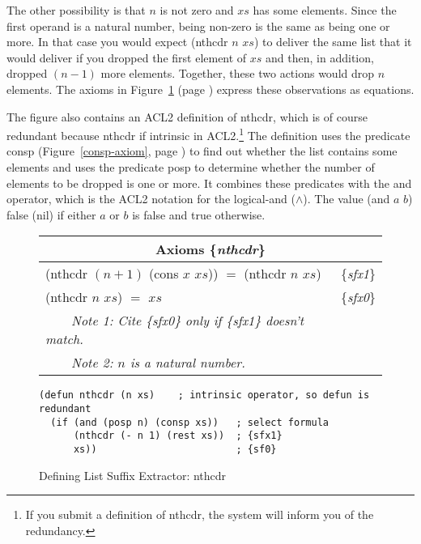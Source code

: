 The other possibility is that $n$ is not zero and $xs$ has some elements.
Since the first operand is a natural number,
being non-zero is the same as being one or more.
In that case you would expect \textsf{(nthcdr $n$ $xs$)} to deliver
the same list that it would deliver
if you dropped the first element of $xs$
and then, in addition, dropped $(n - 1)$ more elements.
Together, these two actions would drop $n$ elements.
The axioms in Figure~\ref{fig:nthcdr-defun} (page \pageref{fig:nthcdr-defun})
express these observations as equations.

The figure also contains an ACL2 definition of \textsf{nthcdr}, which
is of course redundant because \textsf{nthcdr} if intrinsic in ACL2.\footnote{If
you submit a definition of \textsf{nthcdr},
the system will inform you of the redundancy.}
The definition uses the predicate \textsf{consp}
(Figure~\ref{consp-axiom}, page \pageref{consp-axiom})
to find out whether the list contains some elements and
uses the predicate
\label{posp-def} \textsf{posp}
to determine whether
the number of elements to be dropped is one or more.
It combines these predicates with the \textsf{and} operator,
which is the ACL2 notation for the logical-and ($\wedge$).
\label{and-op=informal}
The value \textsf{(and $a$ $b$)} false (nil)
if either $a$ or $b$ is false and true otherwise.

\begin{figure}
\begin{center}
\begin{tabular}{ll}
\multicolumn{2}{c}{Axioms \{\emph{nthcdr}\}} \\
\hline
\textsf{(nthcdr $(n+1)$ (cons $x$ $xs$))} $=$ \textsf{(nthcdr $n$ $xs$)} & \{\emph{sfx1}\} \\
\textsf{(nthcdr $n$ $xs$)} $=$ $xs$                            & \{\emph{sfx0}\}   \\
~~~~\emph{Note 1: Cite \{\emph{sfx0}\} only if \{\emph{sfx1}\} doesn't match.}&\\ %
~~~~\emph{Note 2: $n$ is a natural number.}
\end{tabular}
\begin{code}
\begin{verbatim}
(defun nthcdr (n xs)    ; intrinsic operator, so defun is redundant
  (if (and (posp n) (consp xs))   ; select formula
      (nthcdr (- n 1) (rest xs))  ; {sfx1}
      xs))                        ; {sf0}
\end{verbatim}
\end{code}
\end{center}
\caption{Defining List Suffix Extractor: nthcdr}
\label{fig:nthcdr-defun}
\end{figure}

